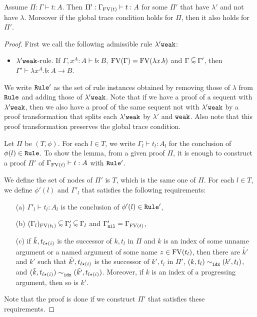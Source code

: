 \begin{lemma}\label{lem:thinning}
  Assume $\Pi:\Gamma\vdash t:A$.
  Then $\Pi':\Gamma_{{{\rm FV}}(t)}\vdash t:A$ for some $\Pi'$ that have $\lambda'$ and not have $\lambda$.
  Moreover if the global trace condition holds for $\Pi$, then it also holds for $\Pi'$. 
\end{lemma}
\begin{proof}
  First we call the following admissible rule $\lambda'{\tt weak}$:
  \begin{itemize}
  \item
    $\lambda'{\tt weak}$-rule.
    If $\Gamma, x^A:A \vdash b: B$, ${{\rm FV}}(\Gamma) = {{\rm FV}}(\lambda x.b)$ and $\Gamma\subseteqsim \Gamma'$, 
    then $ \Gamma' \vdash \lambda x^A.b :A \rightarrow B$.
  \end{itemize}
  We write ${\tt Rule}'$ as the set of rule instances obtained by removing
  those of $\lambda$ from ${\tt Rule}$ and adding those of $\lambda'{\tt weak}$. 
  Note that if we have a proof of a sequent with $\lambda'{\tt weak}$,
  then we also have a proof of the same sequent not with $\lambda'{\tt weak}$
  by a proof transformation that splits each $\lambda'{\tt weak}$ by $\lambda'$ and ${\tt weak}$. 
  Also note that this proof transformation preserves the global trace condition.

  Let $\Pi$ be $(T,\phi)$.
  For each $l \in T$, we write $\Gamma_l\vdash t_l:A_l$
  for the conclusion of $\phi(l) \in {\tt Rule}$. 
  To show the lemma, from a given proof $\Pi$, 
  it is enough to construct a proof $\Pi'$ of $\Gamma_{{{\rm FV}}(t)}\vdash t:A$ with ${\tt Rule}'$.
  
  We define the set of nodes of $\Pi'$ is $T$, which is the same one of $\Pi$. 
  For each $l\in T$, we define $\phi'(l)$ and $\Gamma'_l$ that satisfies
  the following requirements:
  \begin{itemize}
  \item[(a)]
    $\Gamma'_l\vdash t_l:A_l$ is the conclusion of $\phi'(l) \in {\tt Rule}'$,
  \item[(b)]
    $\Restrict{(\Gamma_l)}{\FV(t_l)} \subseteqsim \Gamma'_l \subseteqsim \Gamma_l$
    and $\Gamma'_{{\tt nil}} = \Gamma_{{{\rm FV}}(t)}$, 
  \item[(c)]
    if $\tilde{k},t_{l{\star}(i)}$ is the successor of $k,t_l$ in $\Pi$
    and $k$ is an index of some unname argument
    or a named argument of some name $z\in{{\rm FV}}(t_l)$, 
    then there are $\tilde{k'}$ and $k'$ such that
    $\tilde{k'},t_{l{\star}(i)}$ is the successor of $k',t_l$ in $\Pi'$, 
    $(k,t_l) \sim^{}_{{\tt idx}} (k',t_l)$,
    and $(\tilde{k},t_{l{\star}(i)}) \sim^{}_{{\tt idx}} (\tilde{k'},t_{l{\star}(i)})$.
    Moreover, if $k$ is an index of a progressing argument, then so is $k'$.
  \end{itemize}
  Note that the proof is done if we construct $\Pi'$ that satisfies these requirements. 
  

\end{proof}
